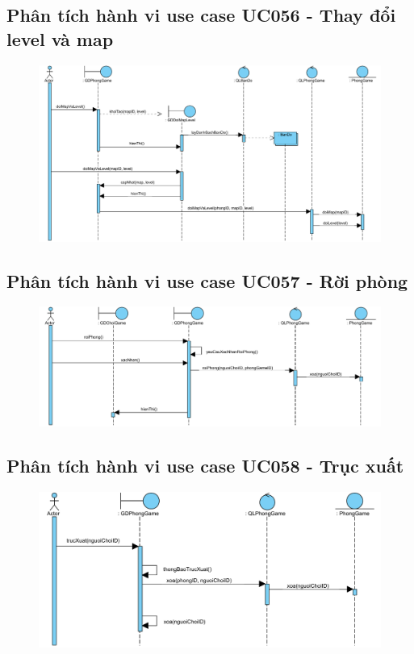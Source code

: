 \documentclass[3p]{elsarticle}
\begin{document}
\subsection{Phân tích hành vi use case UC056 - Thay đổi level và map}
\begin{figure}[!htbp]
	\hspace*{-.5in}
	\centering
	\includegraphics[scale=.55]{images/sequence-pdfs/gamer/PlayGame_ChangeMapLevel.pdf}
\end{figure}

\subsection{Phân tích hành vi use case UC057 - Rời phòng}
\begin{figure}[!htbp]
	\hspace*{-.5in}
	\centering
	\includegraphics[scale=.55]{images/sequence-pdfs/gamer/PlayGame_Leave.pdf}
\end{figure}
\newpage

\subsection{Phân tích hành vi use case UC058 - Trục xuất}
\begin{figure}[!htbp]
	\hspace*{-.5in}
	\centering
	\includegraphics[scale=.55]{images/sequence-pdfs/gamer/PlayGame_Kick.pdf}
\end{figure}
\end{document}
